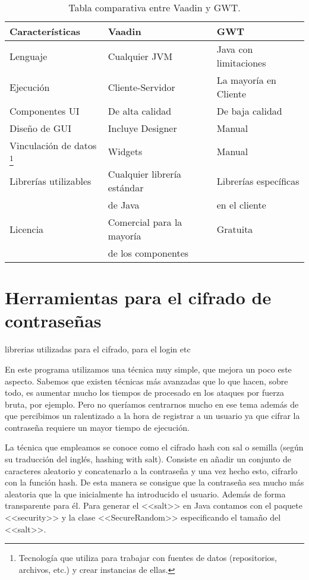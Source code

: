 \begin{table}[htbp]
\begin{center}
\begin{tabular}{|l|l|l|}
\hline
Características & Vaadin & GWT \\
\hline \hline \hline
Lenguaje & Cualquier JVM & Java con limitaciones \\ \hline
Ejecución & Cliente-Servidor & La mayoría en Cliente \\ \hline
Componentes UI & De alta calidad & De baja calidad \\ \hline
Diseño de GUI & Incluye Designer & Manual \\ \hline
Vinculación de datos \footnote{Tecnología que utiliza para trabajar con fuentes de datos (repositorios, archivos, etc.) y crear instancias de ellas.} & Widgets & Manual \\ \hline
Librerías utilizables & Cualquier librería estándar & Librerías específicas\\ & de Java & en el cliente \\ \hline 
Licencia & Comercial para la mayoría & Gratuita\\ & de los componentes & \\ \hline 
\end{tabular}
\caption{Tabla comparativa entre Vaadin y GWT.}
\label{tabla:comparativa}
\end{center}
\end{table}




\section{Herramientas para el cifrado de contraseñas}
librerias utilizadas para el cifrado, para el login etc


En este programa utilizamos una técnica muy simple, que mejora un poco este aspecto. Sabemos que existen técnicas más avanzadas que lo que hacen, sobre todo, es aumentar mucho los tiempos de procesado en los ataques por fuerza bruta, por ejemplo. Pero no queríamos centrarnos mucho en ese tema además de que percibimos un ralentizado a la hora de registrar a un usuario ya que cifrar la contraseña requiere un mayor tiempo de ejecución.

La técnica que empleamos se conoce como el cifrado hash con sal o semilla (según su traducción del inglés, hashing with salt). Consiste en añadir un conjunto de caracteres aleatorio y concatenarlo a la contraseña y una vez hecho esto, cifrarlo con la función hash. De esta manera se consigue que la contraseña sea mucho más aleatoria que la que inicialmente ha introducido el usuario. Además de forma transparente para él. Para generar el <<salt>> en Java contamos con el paquete <<security>> y la clase <<SecureRandom>> especificando el tamaño del <<salt>>. 

